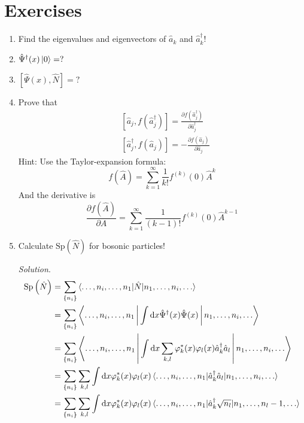 \documentclass[11pt, a4paper]{article}
\newcommand{\dd}{\mathrm{d}}
\newcommand{\Sp}[1]{\mathrm{Sp}\left({#1}\right)}
\begin{document}
\section{Exercises}
\begin{enumerate}
    \item Find the eigenvalues and eigenvectors of $\hat a_k$ and $\hat a_k^{\dagger}$!
    \item $\hat\Psi^{\dagger}(x)\ket 0 = ?$
    \item $[\hat \Psi(x), \hat N] = ?$
    \item Prove that 
    \begin{align*}
        &[\hat a_j, f(\hat a_j^{\dagger})] = \frac{\partial f(\hat a_j^{\dagger})}{\partial \hat a_j^{\dagger}}\\
        &[\hat a_j^{\dagger}, f(\hat a_j)] = -\frac{\partial f(\hat a_j)}{\partial \hat a_j}
    \end{align*}
    Hint: Use the Taylor-expansion formula:
    \begin{equation*}
        f(\hat A) = \sum\limits_{k=1}^{\infty} \frac{1}{k!}f^{(k)}(0)\hat A^k
    \end{equation*}
    And the derivative is 
    \begin{equation*}
        \frac{\partial f(\hat A)}{\partial A} = \sum\limits_{k=1}^{\infty} \frac{1}{(k-1)!}f^{(k)}(0)\hat A^{k-1}
    \end{equation*}
    \item Calculate $\Sp {\hat N}$ for bosonic particles!
    \par\textit{Solution}.
    \begin{align*}
        \Sp{\hat N} &= \sum\limits_{\{n_i\}}\braket{\dots,n_i,\dots,n_1 | \hat N |n_1, \dots, n_i, \dots} \\
        & = \sum\limits_{\{n_i\}}\Braket{\dots,n_i,\dots,n_1 | \int\dd x \hat\Psi^{\dagger}(x)\hat\Psi(x) |n_1, \dots, n_i, \dots} \\
        & = \sum\limits_{\{n_i\}}\Braket{\dots,n_i,\dots,n_1 | \int\dd x \sum\limits_{k,l}\varphi^*_k(x)\varphi_l(x)
        \hat a_k^{\dagger}\hat a_l |n_1, \dots, n_i, \dots} \\
        & = \sum\limits_{\{n_i\}}\sum\limits_{k,l}\int\dd x \varphi^*_k(x)\varphi_l(x) \braket{\dots,n_i,\dots,n_1 | \hat a_k^{\dagger}\hat a_l |n_1, \dots, n_i, \dots} \\
        & = \sum\limits_{\{n_i\}}\sum\limits_{k,l}\int\dd x \varphi^*_k(x)\varphi_l(x) \braket{\dots,n_i,\dots,n_1 | \hat a_k^{\dagger}
        \sqrt{n_l} |n_1, \dots, n_l-1, \dots} \\

\end{align*}
\end{enumerate}
\end{document}
